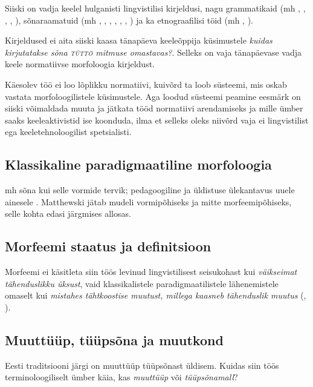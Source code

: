 \documentclass[12pt,a4paper]{article}
\begin{document}
Siiski on vadja keelel hulganisti lingvistilisi kirjeldusi, nagu grammatikaid (mh \cite{ahlqvist_wotisk_1856}, \cite{airila_vatjan_1934}, \cite{tsvetkov_vadja_2008}, \cite{ariste_grammar_1968}, \cite{__2011}), sõnaraamatuid (mh \cite{tsvetkov_vatjan_1995}, \cite{ariste_vadja_1943}, \cite{laakso_vatjan_1989}, \cite{raag_dictionary_1982}, \cite{pomberg_vadja_1991}, \cite{grunberg_vadja_2013}, \cite{heinsoo_vadsonakopittoja_2015}) ja ka etnograafilisi töid (mh \cite{kass_kasitoo-_1961}, \cite{malk_vadja_1977}).

Kirjeldused ei aita siiski kaasa tänapäeva keeleõppija küsimustele \textit{kuidas kirjutatakse sõna \textsc{tüttö} mitmuse omastavas?}. Selleks on vaja tänapäevase vadja keele normatiivse morfoloogia kirjeldust.

Käesolev töö ei loo lõplikku normatiivi, kuivõrd ta loob süsteemi, mis oskab vastata morfoloogilistele küsimustele. Aga loodud süsteemi peamine eesmärk on siiski võimaldada muuta ja jätkata tööd normatiivi arendamiseks ja mille ümber saaks keeleaktivistid ise koonduda, ilma et selleks oleks niivõrd vaja ei lingvistilist ega keeletehnoloogilist spetsialisti.


\subsection{Klassikaline paradigmaatiline morfoloogia}
mh sõna kui selle vormide tervik; pedagoogiline ja üldistuse ülekantavus uuele ainesele \cite{matthews_morphology_1991}. Matthewski jätab mudeli vormipõhiseks ja mitte morfeemipõhiseks, selle kohta edasi järgmises allosas.

\subsection{Morfeemi staatus ja definitsioon}
Morfeemi ei käsitleta siin töös levinud lingvistilisest seisukohast kui \textit{väikseimat tähenduslikku üksust}, vaid klassikalistele paradigmaatilistele lähenemistele omaselt kui \textit{mistahes tähtkoostise muutust, millega kaasneb tähenduslik muutus} (\cite{beard_morpheme_1987}, \cite{beard_lexeme-morpheme_1995}).

\subsection{Muuttüüp, tüüpsõna ja muutkond}
Eesti traditsiooni järgi on muuttüüp tüüpsõnast üldisem. Kuidas siin töös terminoloogiliselt ümber käia, kas \textit{muuttüüp} või \textit{tüüpsõna\-mall}?
\end{document}
